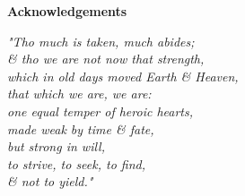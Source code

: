 \begin{center}
\textbf{Acknowledgements}
\end{center}

\begin{center}
    \textit{"Tho much is taken, much abides;\\
    \& tho we are not now that strength,\\
    which in old days moved Earth \& Heaven,\\
    that which we are, we are:\\
    one equal temper of heroic hearts,\\
    made weak by time \& fate,\\
    but strong in will,\\
    to strive, to seek, to find,\\
    \& not to yield."}
\end{center}


\newpage